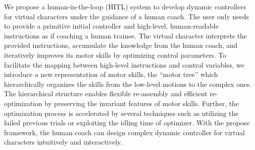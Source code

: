 \begin{summary}


We propose a human-in-the-loop (HITL) system to develop dynamic
controllers for virtual characters under the guidance of a human coach.
The user only needs to provide a primitive initial controller and high-level, 
human-readable instructions as if coaching a human trainee.
The virtual character interprets the provided instructions,
accumulate the knowledge from the human coach,
and iteratively improves its motor skills by optimizing control parameters.
To facilitate the mapping between high-level instructions and
control variables, we introduce a new representation of motor skills,
the ``motor tree'' which hierarchically organizes the skills from the low-level
motions to the complex ones.
The hierarchical structure enables flexible re-assembly and 
efficient re-optimization by preserving the invariant features
of motor skills.
Further, the optimization process is accelerated by several techniques
such as utilizing the failed previous trials or 
exploiting the idling time of optimizer.
With the propose framework, the human coach can design complex dynamic controller
for virtual characters intuitively and interactively.

\end{summary}
